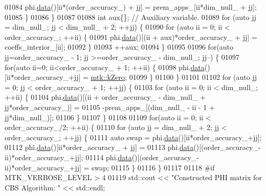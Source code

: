 \begin{DoxyCode}
{{01084         phi.\hyperlink{classmtk_1_1DenseMatrix_a0c33b8a9e01d157c61ddbdf807c25d84}{data}()[ii*(order\_accuracy\_) + jj] = prem\_apps\_[ii*dim\_null\_ + jj];
01085       \}
01086     \}
01087 
01088     \textcolor{keywordtype}{int} aux\{\};  \textcolor{comment}{// Auxiliary variable.}
01089     \textcolor{keywordflow}{for} (\textcolor{keyword}{auto} jj = dim\_null\_; jj < dim\_null\_ + 2; ++jj) \{
01090       \textcolor{keywordflow}{for} (\textcolor{keyword}{auto} ii = 0; ii < order\_accuracy\_; ++ii) \{
01091         phi.\hyperlink{classmtk_1_1DenseMatrix_a0c33b8a9e01d157c61ddbdf807c25d84}{data}()[(ii + aux)*order\_accuracy\_ + jj] = coeffs\_interior\_[ii];
01092       \}
01093       ++aux;
01094     \}
01095 
01096     \textcolor{keywordflow}{for}(\textcolor{keyword}{auto} jj=order\_accuracy\_ - 1; jj >=order\_accuracy\_ - dim\_null\_; jj--) \{
01097       \textcolor{keywordflow}{for}(\textcolor{keyword}{auto} ii=0; ii<order\_accuracy\_ + 1; ++ii) \{
01098         phi.\hyperlink{classmtk_1_1DenseMatrix_a0c33b8a9e01d157c61ddbdf807c25d84}{data}()[ii*order\_accuracy\_+jj] = \hyperlink{group__c01-roots_ga59a451a5fae30d59649bcda274fea271}{mtk::kZero};
01099       \}
01100     \}
01101 
01102     \textcolor{keywordflow}{for} (\textcolor{keyword}{auto} jj = 0; jj < order\_accuracy\_ + 1; ++jj) \{
01103       \textcolor{keywordflow}{for} (\textcolor{keyword}{auto} ii = 0; ii < dim\_null\_; ++ii) \{
01104         phi.\hyperlink{classmtk_1_1DenseMatrix_a0c33b8a9e01d157c61ddbdf807c25d84}{data}()[(ii + order\_accuracy\_ - dim\_null\_ + jj*order\_accuracy\_)] =
01105           -prem\_apps\_[(dim\_null\_ - ii - 1 + jj*dim\_null\_)];
01106       \}
01107     \}
01108 
01109     \textcolor{keywordflow}{for}(\textcolor{keyword}{auto} ii = 0; ii < order\_accuracy\_/2; ++ii) \{
01110       \textcolor{keywordflow}{for} (\textcolor{keyword}{auto} jj = dim\_null\_ + 2; jj < order\_accuracy\_; ++jj) \{
01111         \textcolor{keyword}{auto} swap = phi.\hyperlink{classmtk_1_1DenseMatrix_a0c33b8a9e01d157c61ddbdf807c25d84}{data}()[ii*order\_accuracy\_+jj];
01112         phi.\hyperlink{classmtk_1_1DenseMatrix_a0c33b8a9e01d157c61ddbdf807c25d84}{data}()[ii*order\_accuracy\_ + jj] =
01113           phi.\hyperlink{classmtk_1_1DenseMatrix_a0c33b8a9e01d157c61ddbdf807c25d84}{data}()[(order\_accuracy\_-ii)*order\_accuracy\_+jj];
01114         phi.\hyperlink{classmtk_1_1DenseMatrix_a0c33b8a9e01d157c61ddbdf807c25d84}{data}()[(order\_accuracy\_-ii)*order\_accuracy\_+jj] = swap;
01115       \}
01116     \}
01117 
01118 \textcolor{preprocessor}{    #if MTK\_VERBOSE\_LEVEL > 4}
01119     std::cout << \textcolor{stringliteral}{"Constructed PHI matrix for CBS Algorithm: "} << std::endl;
}}
\end{DoxyCode}
